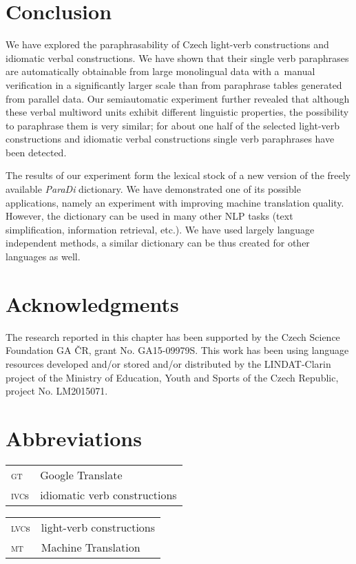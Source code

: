 \documentclass[output=paper
,modfonts
,nonflat]{langsci/langscibook}
\begin{document}
\section{Conclusion}
We have explored the paraphrasability of  Czech light-verb constructions and 
idiomatic verbal constructions. We have shown that their single verb 
paraphrases are automatically obtainable from large monolingual data with 
a~manual verification in a significantly larger scale than from paraphrase 
tables generated from parallel data. Our 
semiautomatic experiment further revealed that although these verbal multiword 
units exhibit different linguistic properties, the possibility to paraphrase 
them is very similar; for about one half of the selected light-verb constructions 
and idiomatic verbal constructions single verb paraphrases have been detected.

The results of our experiment form the lexical stock of a new version of the 
freely available \textit{ParaDi} dictionary. We have demonstrated one of its 
possible applications, namely an experiment with improving machine translation 
quality. However, the dictionary can be used in many other NLP tasks (text 
simplification, information retrieval, etc.). We have used largely language 
independent methods, a similar dictionary can be thus created for other 
languages as well.

\section*{Acknowledgments}
The research reported in this chapter has been supported by the Czech Science 
Foundation GA ČR, grant No. GA15-09979S. This work has been using language 
resources developed and/or stored and/or distributed by the LINDAT-Clarin 
project of the Ministry of Education, Youth and Sports of the Czech Republic, 
project No. LM2015071.

\section*{Abbreviations}
\begin{tabularx}{.49\textwidth}{ll}
\textsc{gt} & Google Translate \\
\textsc{ivc}s & idiomatic verb constructions \\
\end{tabularx}
\begin{tabularx}{.49\textwidth}{ll}
\textsc{lvc}s & light-verb constructions \\
\textsc{mt} & Machine Translation \\
\end{tabularx}


\printbibliography[heading=subbibliography,notkeyword=this]
\end{document}
